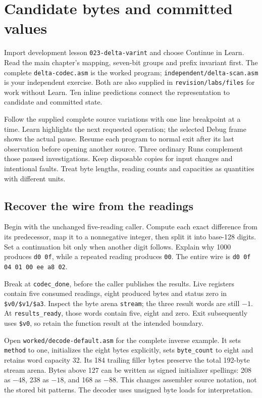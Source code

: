 \chapter{Candidate bytes and committed values}
\label{revision-lab:encodings}

Import development lesson \texttt{023-delta-varint} and choose Continue in Learn.
Read the main chapter's mapping, seven-bit groups and prefix invariant first.
The complete \texttt{delta-codec.asm} is the worked program;
\texttt{independent/delta-scan.asm} is your independent exercise. Both are also
supplied in \texttt{revision/labs/files} for work without Learn. Ten inline
predictions connect the representation to candidate and committed state.

Follow the supplied complete source variations with one line breakpoint at a
time. Learn highlights the next requested operation; the selected Debug frame
shows the actual pause. Resume each program to normal exit after its last
observation before opening another source. Three ordinary Runs complement those
paused investigations. Keep disposable copies for input changes and intentional
faults. Treat byte lengths, reading counts and capacities as quantities with
different units.

\section{Recover the wire from the readings}

Begin with the unchanged five-reading caller. Compute each exact difference from
its predecessor, map it to a nonnegative integer, then split it into base-128
digits. Set a continuation bit only when another digit follows. Explain why
1000 produces \texttt{d0 0f}, while a repeated reading produces \texttt{00}.
The entire wire is \texttt{d0 0f 04 01 00 ee a8 02}.

Break at \texttt{codec\_done}, before the caller publishes the results.
Live registers contain five consumed readings, eight produced bytes and status
zero in \texttt{\$v0/\$v1/\$a3}. Inspect the byte arena \texttt{stream}; the
three result words are still $-1$. At \texttt{results\_ready}, those words
contain five, eight and zero. Exit subsequently uses \texttt{\$v0}, so retain
the function result at the intended boundary.

Open \texttt{worked/decode-default.asm} for the complete inverse example. It
sets \texttt{method} to one, initializes the eight bytes explicitly, sets
\texttt{byte\_count} to eight and retains word capacity 32. Its 184 trailing
filler bytes preserve the total 192-byte stream arena.
Bytes above 127 can be written as signed initializer spellings: 208 as $-48$,
238 as $-18$, and 168 as $-88$. This changes assembler source notation, not the
stored bit patterns. The decoder uses unsigned byte loads for interpretation.

